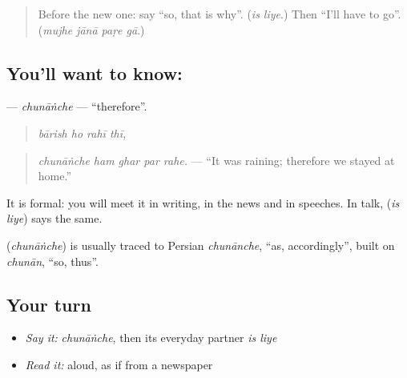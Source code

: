 \begin{quote}
Before the new one: say \textquotedblleft{}so, that is why\textquotedblright{}. (\emph{is liye}.) Then \textquotedblleft{}I'll have to go\textquotedblright{}. (\emph{mujhe jānā paṛe gā}.)
\end{quote}

\subsection*{You'll want to know: }
\textbf{} — \emph{chunāṅche} — \textquotedblleft{}therefore\textquotedblright{}.

\begin{quote}
\textbf{   }
\end{quote}

\begin{quote}
\emph{bārish ho rahī thī,}
\end{quote}

\begin{quote}
\textbf{    }
\end{quote}

\begin{quote}
\emph{chunāṅche ham ghar par rahe.} — \textquotedblleft{}It was raining; therefore we stayed at home.\textquotedblright{}
\end{quote}

It is formal: you will meet it in writing, in the news and in speeches. In talk, \textbf{ } (\emph{is liye}) says the same.

\begin{cousinweb}
\textbf{} (\emph{chunāṅche}) is usually traced to Persian \emph{chunānche}, \textquotedblleft{}as, accordingly\textquotedblright{}, built on \emph{chunān}, \textquotedblleft{}so, thus\textquotedblright{}.
\end{cousinweb}

\subsection*{Your turn}
\begin{itemize}
\raggedright
  \item \emph{Say it:} \emph{chunāṅche}, then its everyday partner \emph{is liye}
  \item \emph{Read it:} \textbf{    } aloud, as if from a newspaper
\end{itemize}

